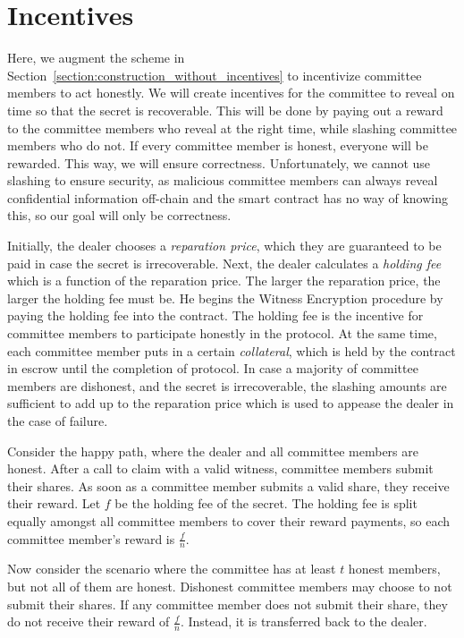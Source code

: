 \section{Incentives}\label{section:construction_incentives}
Here, we augment the scheme in Section~\ref{section:construction_without_incentives} to incentivize committee members to act honestly.
We will create incentives for the committee to reveal on time so that the secret is recoverable.
This will be done by paying out a reward to the committee members who reveal at the right time, while slashing committee members who do not.
If every committee member is honest, everyone will be rewarded.
This way, we will ensure correctness.
Unfortunately, we cannot use slashing to ensure security, as malicious committee members can always reveal confidential information off-chain and the smart contract has no way of knowing this, so our goal will only be correctness.

Initially, the dealer chooses a \emph{reparation price}, which they are guaranteed to be paid in case the secret is irrecoverable.
Next, the dealer calculates a \emph{holding fee} which is a function of the reparation price.
The larger the reparation price, the larger the holding fee must be. 
He begins the Witness Encryption procedure by paying the holding fee into the contract.
The holding fee is the incentive for committee members to participate honestly in the protocol.
At the same time, each committee member puts in a certain \emph{collateral}, which is held by the contract in escrow until the completion of protocol.
In case a majority of committee members are dishonest, and the secret is irrecoverable, the slashing amounts are sufficient to add up to the reparation price which is used to appease the dealer in the case of failure.

Consider the happy path, where the dealer and all committee members are honest.
After a call to \textsf{claim} with a valid witness, committee members submit their shares.
As soon as a committee member submits a valid share, they receive their reward.
Let $f$ be the holding fee of the secret.
The holding fee is split equally amongst all committee members to cover their reward payments, so each committee member's reward is $\frac{f}{n}$.

Now consider the scenario where the committee has at least $t$ honest members, but not all of them are honest.
Dishonest committee members may choose to not submit their shares.
If any committee member does not submit their share, they do not receive their reward of $\frac{f}{n}$.
Instead, it is transferred back to the dealer.

